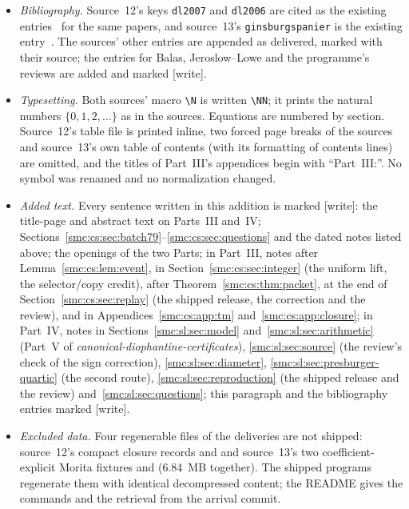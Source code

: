 \documentclass[11pt,letterpaper]{article}
\numberwithin{equation}{section}
\theoremstyle{definition}
\theoremstyle{remark}
\newcommand{\N}{\mathbb N_0}
\newcommand{\NN}{\mathbb N}
\newcommand{\wtag}{\textup{[write]}}
\begin{document}
\begin{itemize}
\item \emph{Bibliography.} Source~12's keys \texttt{dl2007} and \texttt{dl2006} are cited as the existing entries~\cite{DL07,DL06} for the same papers, and source~13's \texttt{ginsburgspanier} is the existing entry~\cite{ginsburgspanier}. The sources' other entries are appended as delivered, marked with their source; the entries for Balas, Jeroslow--Lowe and the programme's reviews are added and marked \wtag.
\item \emph{Typesetting.} Both sources' macro \verb|\N| is written \verb|\NN|; it prints the natural numbers $\{0,1,2,\ldots\}$ as in the sources. Equations are numbered by section. Source~12's table file is printed inline, two forced page breaks of the sources and source~13's own table of contents (with its formatting of contents lines) are omitted, and the titles of Part~III's appendices begin with ``Part~III:''. No symbol was renamed and no normalization changed.
\item \emph{Added text.} Every sentence written in this addition is marked \wtag: the title-page and abstract text on Parts~III and~IV; Sections~\ref{smc:cs:sec:batch79}--\ref{smc:cs:sec:questions} and the dated notes listed above; the openings of the two Parts; in Part~III, notes after Lemma~\ref{smc:cs:lem:event}, in Section~\ref{smc:cs:sec:integer} (the uniform lift, the selector/copy credit), after Theorem~\ref{smc:cs:thm:packet}, at the end of Section~\ref{smc:cs:sec:replay} (the shipped release, the correction and the review), and in Appendices~\ref{smc:cs:app:tm} and~\ref{smc:cs:app:closure}; in Part~IV, notes in Sections~\ref{smc:sl:sec:model} and~\ref{smc:sl:sec:arithmetic} (Part~V of \emph{canonical-diophantine-certificates}), \ref{smc:sl:sec:source} (the review's check of the sign correction), \ref{smc:sl:sec:diameter}, \ref{smc:sl:sec:presburger-quartic} (the second route), \ref{smc:sl:sec:reproduction} (the shipped release and the review) and~\ref{smc:sl:sec:questions}; this paragraph and the bibliography entries marked \wtag.
\item \emph{Excluded data.} Four regenerable files of the deliveries are not shipped: source~12's compact closure records  and  and source~13's two coefficient-explicit Morita fixtures  and  (6.84~MB together). The shipped programs regenerate them with identical decompressed content; the README gives the commands and the retrieval from the arrival commit.
\end{itemize}
\end{document}
